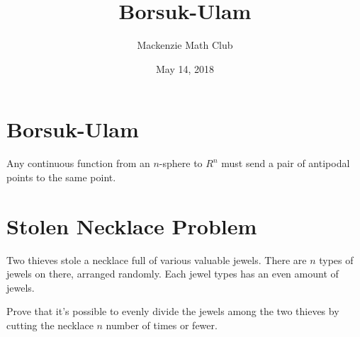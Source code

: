 

\title{Borsuk-Ulam}
\author{Mackenzie Math Club}
\date{May 14, 2018}



	\section*{Borsuk-Ulam}
		Any continuous function from an $n$-sphere to $R^n$ must send a pair of antipodal points to the same point.
	\section*{Stolen Necklace Problem}
		Two thieves stole a necklace full of various valuable jewels.
		There are $n$ types of jewels on there, arranged randomly.
		Each jewel types has an even amount of jewels.
		
		Prove that it's possible to evenly divide the jewels among the two thieves by cutting the necklace $n$ number of times or fewer.

